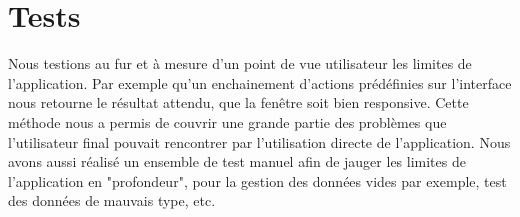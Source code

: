\documentclass{article}
\begin{document}
\section{Tests}
Nous testions au fur et à mesure d'un point de vue utilisateur les limites de l'application. Par exemple qu'un enchainement d'actions prédéfinies sur l'interface nous retourne le résultat attendu, que la fenêtre soit bien responsive. Cette méthode nous a permis de couvrir une grande partie des problèmes que l'utilisateur final pouvait rencontrer par l'utilisation directe de l'application.
Nous avons aussi réalisé un ensemble de test manuel afin de jauger les limites de l'application en "profondeur", pour la gestion des données vides par exemple, test des données de mauvais type, etc.





\end{document}
